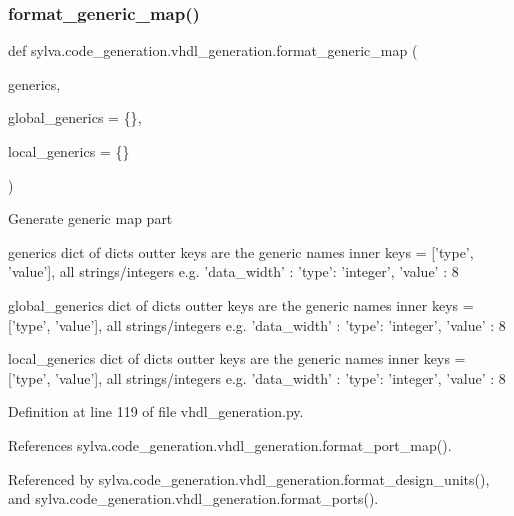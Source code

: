 \subsubsection{\texorpdfstring{format\+\_\+generic\+\_\+map()}{format\_generic\_map()}}
{\footnotesize\ttfamily def sylva.\+code\+\_\+generation.\+vhdl\+\_\+generation.\+format\+\_\+generic\+\_\+map (\begin{DoxyParamCaption}\item[{}]{generics,  }\item[{}]{global\+\_\+generics = {\ttfamily \{\}},  }\item[{}]{local\+\_\+generics = {\ttfamily \{\}} }\end{DoxyParamCaption})}

\begin{DoxyVerb}Generate generic map part

  generics
    dict of dicts
    outter keys are the generic names
    inner keys = ['type', 'value'], all strings/integers
    e.g. { 'data_width' : { 'type': 'integer', 'value' : 8 } }

  global_generics
    dict of dicts
    outter keys are the generic names
    inner keys = ['type', 'value'], all strings/integers
    e.g. { 'data_width' : { 'type': 'integer', 'value' : 8 } }

  local_generics
    dict of dicts
    outter keys are the generic names
    inner keys = ['type', 'value'], all strings/integers
    e.g. { 'data_width' : { 'type': 'integer', 'value' : 8 } }
\end{DoxyVerb}
 

Definition at line 119 of file vhdl\+\_\+generation.\+py.



References sylva.\+code\+\_\+generation.\+vhdl\+\_\+generation.\+format\+\_\+port\+\_\+map().



Referenced by sylva.\+code\+\_\+generation.\+vhdl\+\_\+generation.\+format\+\_\+design\+\_\+units(), and sylva.\+code\+\_\+generation.\+vhdl\+\_\+generation.\+format\+\_\+ports().


